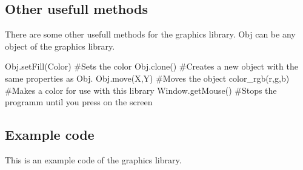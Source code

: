 \newpage
\subsection{Other usefull methods}
There are some other usefull methods for the graphics library. Obj can be any object of the graphics library.
\begin{fullwidth}
\begin{python}
Obj.setFill(Color) #Sets the color
Obj.clone() #Creates a new object with the same properties as Obj.
Obj.move(X,Y) #Moves the object
color_rgb(r,g,b) #Makes a color for use with this library
Window.getMouse() #Stops the programm until you press on the screen
\end{python}
\end{fullwidth}

\subsection{Example code}
This is an example code of the graphics library.

